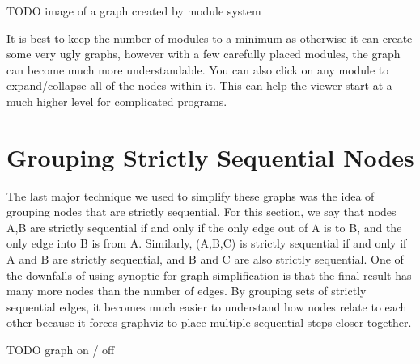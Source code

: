 TODO image of a graph created by module system

It is best to keep the number of modules to a minimum as otherwise it can create some very ugly graphs, however with a few carefully placed modules, the graph can become much more understandable. You can also click on any module to expand/collapse all of the nodes within it. This can help the viewer start at a much higher level for complicated programs.



\section{Grouping Strictly Sequential Nodes}
The last major technique we used to simplify these graphs was the idea of grouping nodes that are strictly sequential. For this section, we say that nodes A,B are strictly sequential if and only if the only edge out of A is to B, and the only edge into B is from A. Similarly, (A,B,C) is strictly sequential if and only if A and B are strictly sequential, and B and C are also strictly sequential. One of the downfalls of using synoptic for graph simplification is that the final result has many more nodes than the number of edges. By grouping sets of strictly sequential edges, it becomes much easier to understand how nodes relate to each other because it forces graphviz to place multiple sequential steps closer together.


TODO graph on / off

